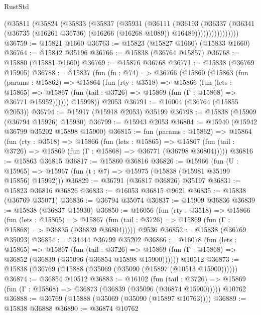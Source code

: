 \begin{lexlean}{RustStd}
\begin{coremodule}
                (@35811
                  (@35824
                    (@35833
                      (@35837
                        (@35931
                          (@36111
                            (@36193
                              (@36337
                                (@36341
                                  (@36735
                                    (@16261 @36736)
                                    (@16266 (@16268 @1089))
                                    @16489))))))))))))))))
@36759 := @15821 @1660
@36763 := @15823 (@15827 @1660) (@15833 @1660)
@36764 := @15842 @35196
@36766 := @15838 (@36764 @15857)
@36768 := @15880 (@15881 @1660)
@36769 := @15876 @36768
@36771 := @15838 (@36769 @15905)
@36788 := @15837
    (fun (fn : @74) =>
    @36766
      (@15860
        (@15863
          (fun (params : @15862) =>
          @15864
            (fun (rty : @3518) =>
            @15866
              (fun (lets : @15865) =>
              @15867 (fun (tail : @3726) => @15869 (fun (Γ : @15868) => @36771 @15952))))))
        @15998))
    @2053
@36791 := @16004 (@36764 (@15855 @2053))
@36794 := @15917 (@15918 @2053) @35199
@36798 := @15838 (@15909 (@36794 @15926) @15930)
@36799 := @15943 @2053
@36804 := @15940 (@15942 @36799 @35202 @15898 @15900)
@36815 := fun (params : @15862) =>
  @15864
    (fun (rty : @3518) =>
    @15866
      (fun (lets : @15865) =>
      @15867 (fun (tail : @3726) => @15869 (fun (Γ : @15868) => @36771 (@36798 @36804)))))
@36816 := @15863 @36815
@36817 := @15860 @36816
@36826 := @15966
    (fun (U : @15965) => @15967 (fun (t : @7) => @15975 (@15838 (@15981 @35199 @15856) @15992)))
@36829 := @36791 (@36817 @36826) @35197
@36831 := @15823 @36816 @36826
@36833 := @16053 @36815 @9621
@36835 := @15838 (@36769 @35071)
@36836 := @36794 @35074
@36837 := @15909 @36836
@36839 := @15838 (@36837 @15930)
@36850 := @16056
    (fun (rty : @3518) =>
    @15866
      (fun (lets : @15865) =>
      @15867 (fun (tail : @3726) => @15869 (fun (Γ : @15868) => @36835 (@36839 @36804)))))
    @9536
@36852 := @15838 (@36769 @35093)
@36854 := @34444 @36799 @35202
@36866 := @16078
    (fun (lets : @15865) =>
    @15867
      (fun (tail : @3726) =>
      @15869 (fun (Γ : @15868) => @36852 (@36839 (@35096 (@36854 @15898 @15900))))))
    @10512
@36873 := @15838 (@36769 (@15888 (@35069 (@35090 (@15897 (@10513 @15900))))))
@36874 := @36854 @10512
@36883 := @16102
    (fun (tail : @3726) => @15869 (fun (Γ : @15868) => @36873 (@36839 (@35096 (@36874 @15900)))))
    @10762
@36888 := @36769 (@15888 (@35069 (@35090 (@15897 @10763))))
@36889 := @15838 @36888
@36890 := @36874 @10762

\end{coremodule}
\end{lexlean}
